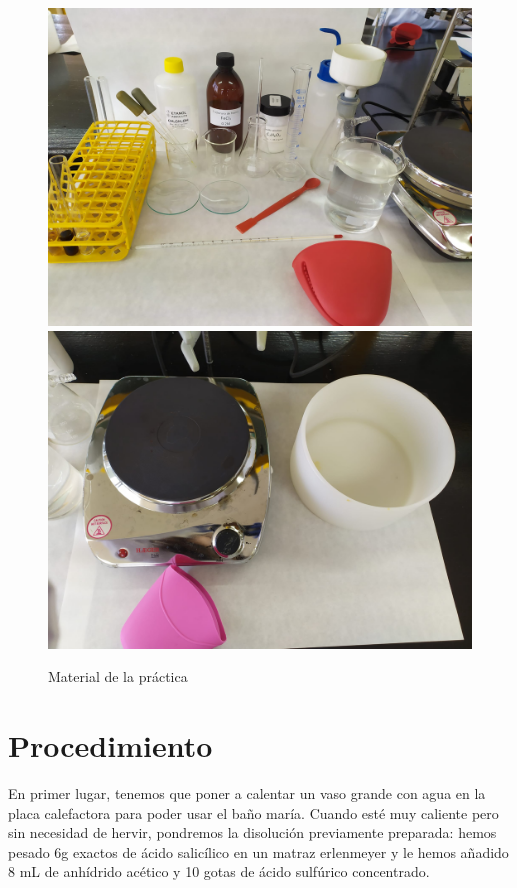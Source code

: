 \begin{figure}[h]
    \centering
    \hspace*{-2.3cm}
        \includegraphics[scale = 0.1]{fotos/set6-1.jpeg}
        \includegraphics[scale = 0.1]{fotos/set6-2.jpeg}
    \hspace*{-2.3cm}
    \caption{Material de la práctica}
\end{figure}

\clearpage

\section{Procedimiento}\label{proc}
\noindent En primer lugar, tenemos que poner a calentar un vaso grande con agua en la placa calefactora para poder usar el baño maría. Cuando esté muy caliente pero sin necesidad de hervir, pondremos la disolución previamente preparada: hemos pesado 6g exactos de ácido salicílico en un matraz erlenmeyer y le hemos añadido 8 mL de anhídrido acético y 10 gotas de ácido sulfúrico concentrado. 

